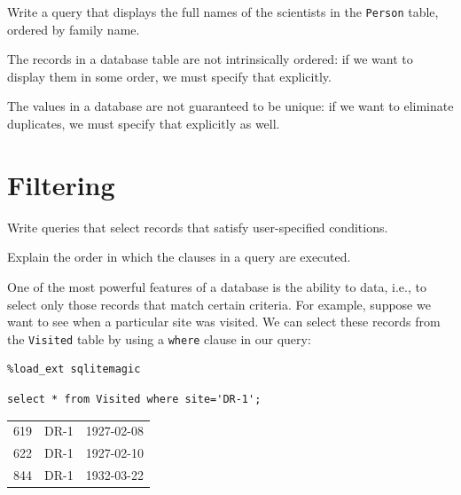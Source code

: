 \documentclass{book}
\begin{document}
\begin{challenge}
  Write a query that displays the full names of the scientists in the
  \texttt{Person} table, ordered by family name.
\end{challenge}

\begin{keypoints}
\begin{swcitemize}
\item
  The records in a database table are not intrinsically ordered: if we
  want to display them in some order, we must specify that explicitly.
\item
  The values in a database are not guaranteed to be unique: if we want
  to eliminate duplicates, we must specify that explicitly as well.
\end{swcitemize}
\end{keypoints}

\section{Filtering}

\begin{objectives}
\begin{swcitemize}
\item
  Write queries that select records that satisfy user-specified
  conditions.
\item
  Explain the order in which the clauses in a query are executed.
\end{swcitemize}
\end{objectives}

One of the most powerful features of a database is the ability to
 data, i.e., to select only those records
that match certain criteria. For example, suppose we want to see when a
particular site was visited. We can select these records from the
\texttt{Visited} table by using a \texttt{where} clause in our query:

\begin{verbatim}
%load_ext sqlitemagic
\end{verbatim}

\begin{verbatim}
select * from Visited where site='DR-1';
\end{verbatim}

\begin{tabular}{lll}
619 & DR-1 & 1927-02-08 \\
622 & DR-1 & 1927-02-10 \\
844 & DR-1 & 1932-03-22 \\
\end{tabular}
\end{document}
